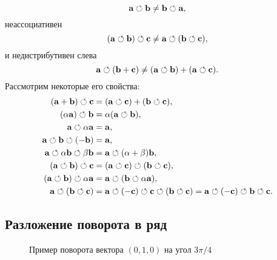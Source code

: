 $$
\a\rotop\b \neq \b\rotop \a,
$$
неассоциативен 
$$
(\a\rotop\b) \rotop \c \neq \a\rotop (\b \rotop \c),
$$
и недистрибутивен слева 
$$
\a\rotop(\b + \c) \neq (\a\rotop \b ) + (\a \rotop \c).
$$
Рассмотрим некоторые его свойства:
\begin{align}
(\a + \b) \rotop \c &= (\a \rotop \c) + (\b \rotop \c),  \notag\\
(\alpha \a) \rotop \b &= \alpha ( \a \rotop \b ),  \notag\\
\a \rotop \alpha \a &= \a,  \notag\\
\a \rotop \b \rotop (-\b) & = \a,  \notag\\
\a \rotop \alpha \b \rotop \beta \b &= \a \rotop (\alpha + \beta) \b,  \notag\\
(\a \rotop \b ) \rotop \c &= (\a \rotop \c) \rotop ( \b \rotop \c),   \notag\\
( \a \rotop \b ) \rotop \alpha \a &= \a \rotop ( \b \rotop \alpha \a ),  \notag\\
\a \rotop ( \b \rotop \c ) &= \a \rotop (-\c) \rotop \c \rotop ( \b \rotop \c ) = \a \rotop (-\c) \rotop \b \rotop \c. \notag
\end{align}

\subsection{Разложение поворота в ряд}

\begin{figure}[h]
\begin{center}
\end{center}
\caption{Пример поворота вектора $(0,1,0)$ на угол $3\pi/4$}\label{rotop:ulitka:pict} 
\end{figure}

